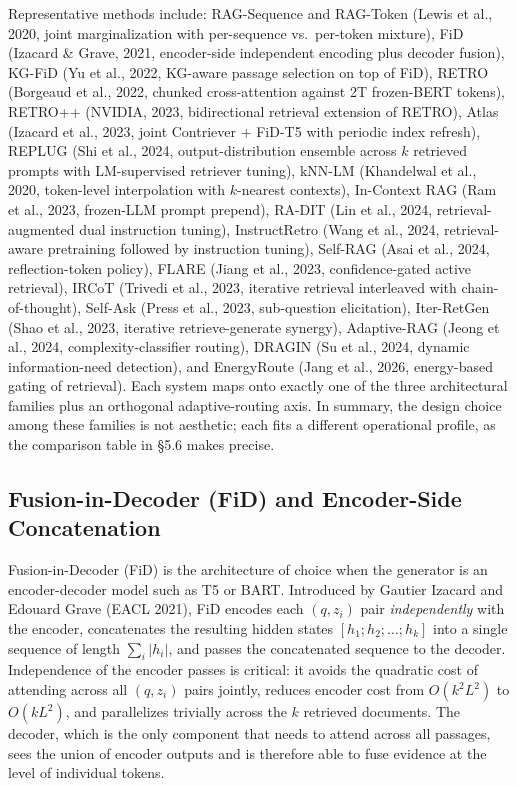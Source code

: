 \documentclass{article}
\begin{document}
Representative methods include: RAG-Sequence and RAG-Token (Lewis et al., 2020, joint marginalization with per-sequence vs.~per-token mixture), FiD (Izacard \& Grave, 2021, encoder-side independent encoding plus decoder fusion), KG-FiD (Yu et al., 2022, KG-aware passage selection on top of FiD), RETRO (Borgeaud et al., 2022, chunked cross-attention against 2T frozen-BERT tokens), RETRO++ (NVIDIA, 2023, bidirectional retrieval extension of RETRO), Atlas (Izacard et al., 2023, joint Contriever + FiD-T5 with periodic index refresh), REPLUG (Shi et al., 2024, output-distribution ensemble across \(k\) retrieved prompts with LM-supervised retriever tuning), kNN-LM (Khandelwal et al., 2020, token-level interpolation with \(k\)-nearest contexts), In-Context RAG (Ram et al., 2023, frozen-LLM prompt prepend), RA-DIT (Lin et al., 2024, retrieval-augmented dual instruction tuning), InstructRetro (Wang et al., 2024, retrieval-aware pretraining followed by instruction tuning), Self-RAG (Asai et al., 2024, reflection-token policy), FLARE (Jiang et al., 2023, confidence-gated active retrieval), IRCoT (Trivedi et al., 2023, iterative retrieval interleaved with chain-of-thought), Self-Ask (Press et al., 2023, sub-question elicitation), Iter-RetGen (Shao et al., 2023, iterative retrieve-generate synergy), Adaptive-RAG (Jeong et al., 2024, complexity-classifier routing), DRAGIN (Su et al., 2024, dynamic information-need detection), and EnergyRoute (Jang et al., 2026, energy-based gating of retrieval). Each system maps onto exactly one of the three architectural families plus an orthogonal adaptive-routing axis. In summary, the design choice among these families is not aesthetic; each fits a different operational profile, as the comparison table in §5.6 makes precise.

\subsection{Fusion-in-Decoder (FiD) and Encoder-Side Concatenation}\label{fusion-in-decoder-fid-and-encoder-side-concatenation}

Fusion-in-Decoder (FiD) is the architecture of choice when the generator is an encoder-decoder model such as T5 or BART. Introduced by Gautier Izacard and Edouard Grave (EACL 2021), FiD encodes each \((q, z_i)\) pair \emph{independently} with the encoder, concatenates the resulting hidden states \([h_1; h_2; \dots; h_k]\) into a single sequence of length \(\sum_i |h_i|\), and passes the concatenated sequence to the decoder. Independence of the encoder passes is critical: it avoids the quadratic cost of attending across all \((q, z_i)\) pairs jointly, reduces encoder cost from \(O(k^2 L^2)\) to \(O(k L^2)\), and parallelizes trivially across the \(k\) retrieved documents. The decoder, which is the only component that needs to attend across all passages, sees the union of encoder outputs and is therefore able to fuse evidence at the level of individual tokens.
\end{document}
